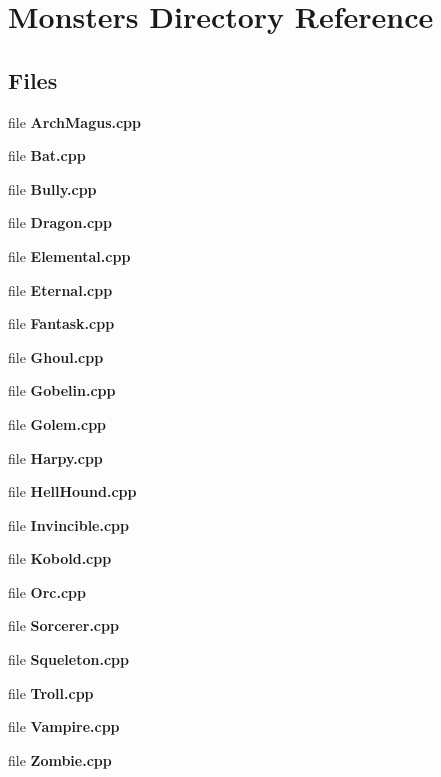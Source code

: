 \section{Monsters Directory Reference}
\label{dir_18d058e859d8cc34dd9cafc9985f8c70}
\subsection*{Files}
\begin{DoxyCompactItemize}
\item 
file {\bf Arch\-Magus.\-cpp}
\item 
file {\bf Bat.\-cpp}
\item 
file {\bf Bully.\-cpp}
\item 
file {\bf Dragon.\-cpp}
\item 
file {\bf Elemental.\-cpp}
\item 
file {\bf Eternal.\-cpp}
\item 
file {\bf Fantask.\-cpp}
\item 
file {\bf Ghoul.\-cpp}
\item 
file {\bf Gobelin.\-cpp}
\item 
file {\bf Golem.\-cpp}
\item 
file {\bf Harpy.\-cpp}
\item 
file {\bf Hell\-Hound.\-cpp}
\item 
file {\bf Invincible.\-cpp}
\item 
file {\bf Kobold.\-cpp}
\item 
file {\bf Orc.\-cpp}
\item 
file {\bf Sorcerer.\-cpp}
\item 
file {\bf Squeleton.\-cpp}
\item 
file {\bf Troll.\-cpp}
\item 
file {\bf Vampire.\-cpp}
\item 
file {\bf Zombie.\-cpp}
\end{DoxyCompactItemize}
